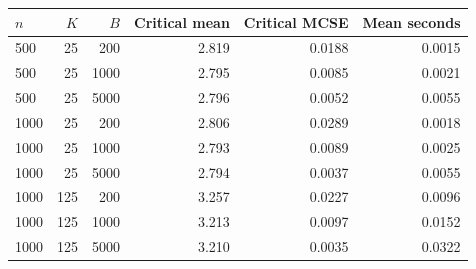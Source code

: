 \begin{tabular}{lrrrrr}
\toprule
$n$ & $K$ & $B$ & Critical mean & Critical MCSE & Mean seconds \\
\midrule
500 & 25 & 200 & 2.819 & 0.0188 & 0.0015 \\
500 & 25 & 1000 & 2.795 & 0.0085 & 0.0021 \\
500 & 25 & 5000 & 2.796 & 0.0052 & 0.0055 \\
1000 & 25 & 200 & 2.806 & 0.0289 & 0.0018 \\
1000 & 25 & 1000 & 2.793 & 0.0089 & 0.0025 \\
1000 & 25 & 5000 & 2.794 & 0.0037 & 0.0055 \\
1000 & 125 & 200 & 3.257 & 0.0227 & 0.0096 \\
1000 & 125 & 1000 & 3.213 & 0.0097 & 0.0152 \\
1000 & 125 & 5000 & 3.210 & 0.0035 & 0.0322 \\
\bottomrule
\end{tabular}

